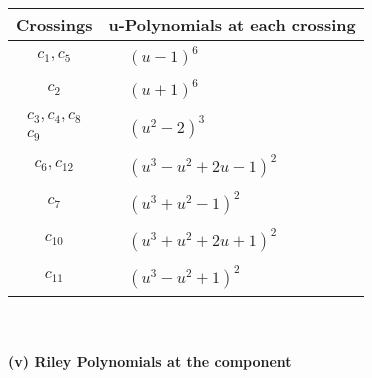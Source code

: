\documentclass[1p]{elsarticle_modified}
\theoremstyle{definition}
\begin{document}
\begin{tabular}{m{50pt}|m{274pt}}
Crossings & \hspace{64pt}u-Polynomials at each crossing \\
\hline $$\begin{aligned}c_{1},c_{5}\end{aligned}$$&$\begin{aligned}
&(u-1)^6
\end{aligned}$\\
\hline $$\begin{aligned}c_{2}\end{aligned}$$&$\begin{aligned}
&(u+1)^6
\end{aligned}$\\
\hline $$\begin{aligned}c_{3},c_{4},c_{8}\\c_{9}\end{aligned}$$&$\begin{aligned}
&(u^2-2)^3
\end{aligned}$\\
\hline $$\begin{aligned}c_{6},c_{12}\end{aligned}$$&$\begin{aligned}
&(u^3- u^2+2 u-1)^2
\end{aligned}$\\
\hline $$\begin{aligned}c_{7}\end{aligned}$$&$\begin{aligned}
&(u^3+u^2-1)^2
\end{aligned}$\\
\hline $$\begin{aligned}c_{10}\end{aligned}$$&$\begin{aligned}
&(u^3+u^2+2 u+1)^2
\end{aligned}$\\
\hline $$\begin{aligned}c_{11}\end{aligned}$$&$\begin{aligned}
&(u^3- u^2+1)^2
\end{aligned}$\\
\hline
\end{tabular}\\~\\
\newpage\renewcommand{\arraystretch}{1}
\flushleft \textbf{(v) Riley Polynomials at the component}\newline \\
\end{document}
